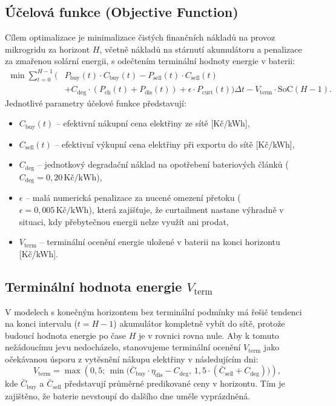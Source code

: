 \documentclass[FM,BP]{tulthesis}
\begin{document}
	\subsection{Účelová funkce (Objective Function)}
	Cílem optimalizace je minimalizace čistých finančních nákladů na provoz mikrogridu za horizont $H$, včetně nákladů na stárnutí akumulátoru a penalizace za zmařenou solární energii, s odečtením terminální hodnoty energie v baterii:
	\begin{equation}
		\label{eq:objective}
		\begin{split}
			\min \sum_{t=0}^{H-1} \Big( & P_{\text{buy}}(t) \cdot C_{\text{buy}}(t) - P_{\text{sell}}(t) \cdot C_{\text{sell}}(t) \\
			& + C_{\text{deg}} \cdot (P_{\text{ch}}(t) + P_{\text{dis}}(t)) + \epsilon \cdot P_{\text{curt}}(t) \Big) \Delta t - V_{\text{term}} \cdot \mathrm{SoC}(H-1).
		\end{split}
	\end{equation}
	Jednotlivé parametry účelové funkce představují:
	\begin{itemize}
		\item $C_{\text{buy}}(t)$ -- efektivní nákupní cena elektřiny ze sítě [Kč/kWh],
		\item $C_{\text{sell}}(t)$ -- efektivní výkupní cena elektřiny při exportu do sítě [Kč/kWh],
		\item $C_{\text{deg}}$ -- jednotkový degradační náklad na opotřebení bateriových článků ($C_{\text{deg}} = 0{,}20\,\text{Kč/kWh}$),
		\item $\epsilon$ -- malá numerická penalizace za nucené omezení přetoku ($\epsilon = 0{,}005\,\text{Kč/kWh}$), která zajišťuje, že curtailment nastane výhradně v situaci, kdy přebytečnou energii nelze využít ani prodat,
		\item $V_{\text{term}}$ -- terminální ocenění energie uložené v baterii na konci horizontu [Kč/kWh].
	\end{itemize}

	\subsection{Terminální hodnota energie \texorpdfstring{$V_{\text{term}}$}{V\_term}}
	V modelech s konečným horizontem bez terminální podmínky má řešič tendenci na konci intervalu ($t = H-1$) akumulátor kompletně vybít do sítě, protože budoucí hodnota energie po čase $H$ je v rovnici rovna nule. Aby k tomuto nežádoucímu jevu nedocházelo, stanovujeme terminální ocenění $V_{\text{term}}$ jako očekávanou úsporu z vytěsnění nákupu elektřiny v následujícím dni:
	\begin{equation}
		\label{eq:vterm}
		V_{\text{term}} = \max \left( 0{,}5; \, \min \Big( \bar{C}_{\text{buy}} \cdot \eta_{\text{dis}} - C_{\text{deg}}, \, 1{,}5 \cdot (\bar{C}_{\text{sell}} + C_{\text{deg}}) \Big) \right),
	\end{equation}
	kde $\bar{C}_{\text{buy}}$ a $\bar{C}_{\text{sell}}$ představují průměrné predikované ceny v horizontu. Tím je zajištěno, že baterie nevstoupí do dalšího dne uměle vyprázdněná.
\end{document}
